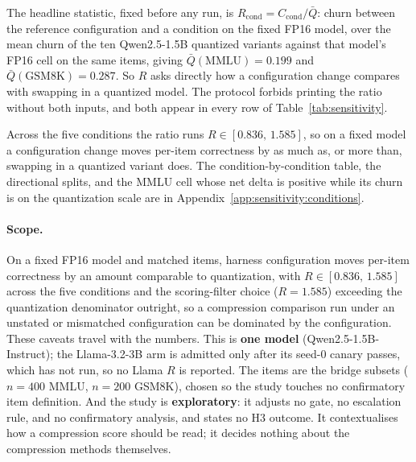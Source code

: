 The headline statistic, fixed before any run, is
$R_{\mathrm{cond}} = C_{\mathrm{cond}}/\bar{Q}$: churn between the reference
configuration and a condition on the fixed FP16 model, over the mean churn of
the ten Qwen2.5-1.5B quantized variants against that model's FP16 cell on the
same items, giving $\bar{Q}(\text{MMLU}) = 0.199$ and
$\bar{Q}(\text{GSM8K}) = 0.287$. So $R$ asks directly how a
configuration change compares with swapping in a quantized model. The protocol
forbids printing the ratio without both inputs, and both appear in every row of
Table~\ref{tab:sensitivity}.

Across the five conditions the ratio runs $R \in [0.836,\,1.585]$, so on a
fixed model a configuration change moves per-item correctness by as much as, or
more than, swapping in a quantized variant does. The condition-by-condition
table, the directional splits, and the MMLU cell whose net delta is positive
while its churn is on the quantization scale are in
Appendix~\ref{app:sensitivity:conditions}.

\paragraph{Scope.}
On a fixed FP16 model and matched items, harness configuration moves per-item
correctness by an amount comparable to quantization, with $R \in [0.836,\,1.585]$
across the five conditions and the scoring-filter choice ($R=1.585$) exceeding
the quantization denominator outright, so a compression comparison run under an
unstated or mismatched configuration can be dominated by the configuration.
These caveats travel with the numbers. This is \textbf{one model}
(Qwen2.5-1.5B-Instruct); the Llama-3.2-3B arm is admitted only after its seed-0
canary passes, which has not run, so no Llama $R$ is reported. The items are the
bridge subsets ($n=400$ MMLU, $n=200$ GSM8K), chosen so the study
touches no confirmatory item definition. And the study is
\textbf{exploratory}: it adjusts no gate, no escalation rule, and no
confirmatory analysis, and states no H3 outcome. It contextualises how a
compression score should be read; it decides nothing about the compression
methods themselves.
